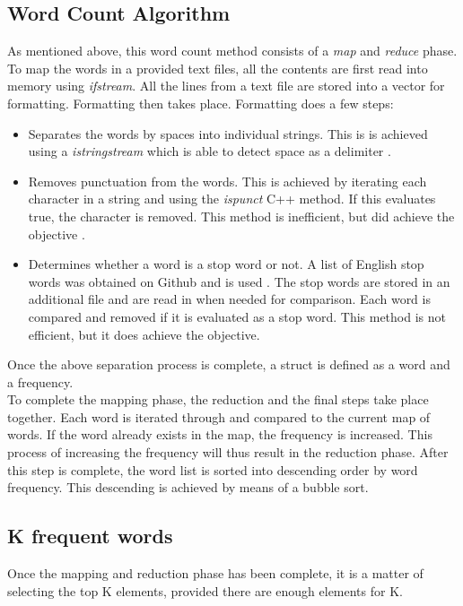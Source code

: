 \documentclass[a4paper, 11pt, onecolumn, conference]{IEEEtran}      %
\begin{document}
\subsection{Word Count Algorithm}
As mentioned above, this word count method consists of a \textit{map} and \textit{reduce} phase.\\
To map the words in a provided text files, all the contents are first read into memory using \textit{ifstream}. All the lines from a text file are stored into a vector for formatting. Formatting then takes place. Formatting does a few steps:
\begin{itemize}
    \item Separates the words by spaces into individual strings. This is is achieved using a \textit{istringstream} which is able to detect space as a delimiter \cite{kartik_split_2018}.
    \item Removes punctuation from the words. This is achieved by iterating each character in a string and using the \textit{ispunct} C++ method. If this evaluates true, the character is removed. This method is inefficient, but did achieve the objective \cite{p0w_c++_nodate}.
    \item Determines whether a word is a stop word or not. A list of English stop words was obtained on Github and is used \cite{sebleier_nltks_nodate}. The stop words are stored in an additional file and are read in when needed for comparison. Each word is compared and removed if it is evaluated as a stop word. This method is not efficient, but it does achieve the objective.
\end{itemize}
Once the above separation process is complete, a struct is defined as a word and a frequency. \\

To complete the mapping phase, the reduction and the final steps take place together. Each word is iterated through and compared to the current map of words. If the word already exists in the map, the frequency is increased. This process of increasing the frequency will thus result in the reduction phase. After this step is complete, the word list is sorted into descending order by word frequency. This descending is achieved by means of a bubble sort.

\subsection{K frequent words}
Once the mapping and reduction phase has been complete, it is a matter of selecting the top K elements, provided there are enough elements for K.
\end{document}
